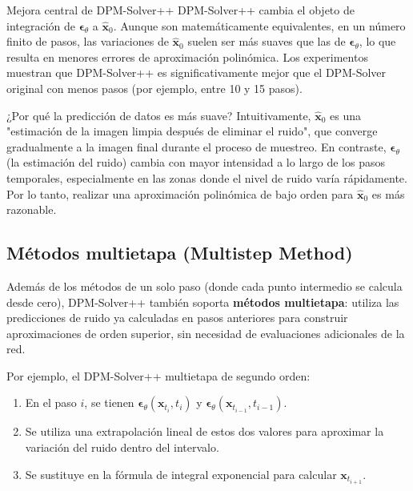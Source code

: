 \documentclass[a4paper]{article}
\begin{document}
\begin{importantbox}{Mejora central de DPM-Solver++}
DPM-Solver++ cambia el objeto de integración de $\boldsymbol{\epsilon}_\theta$ a $\hat{\mathbf{x}}_0$. Aunque son matemáticamente equivalentes, en un número finito de pasos, las variaciones de $\hat{\mathbf{x}}_0$ suelen ser más suaves que las de $\boldsymbol{\epsilon}_\theta$, lo que resulta en menores errores de aproximación polinómica. Los experimentos muestran que DPM-Solver++ es significativamente mejor que el DPM-Solver original con menos pasos (por ejemplo, entre 10 y 15 pasos).
\end{importantbox}

\begin{knowledgebox}{¿Por qué la predicción de datos es más suave?}
Intuitivamente, $\hat{\mathbf{x}}_0$ es una "estimación de la imagen limpia después de eliminar el ruido", que converge gradualmente a la imagen final durante el proceso de muestreo. En contraste, $\boldsymbol{\epsilon}_\theta$ (la estimación del ruido) cambia con mayor intensidad a lo largo de los pasos temporales, especialmente en las zonas donde el nivel de ruido varía rápidamente. Por lo tanto, realizar una aproximación polinómica de bajo orden para $\hat{\mathbf{x}}_0$ es más razonable.
\end{knowledgebox}

\subsection{Métodos multietapa (Multistep Method)}

Además de los métodos de un solo paso (donde cada punto intermedio se calcula desde cero), DPM-Solver++ también soporta \textbf{métodos multietapa}: utiliza las predicciones de ruido ya calculadas en pasos anteriores para construir aproximaciones de orden superior, sin necesidad de evaluaciones adicionales de la red.

Por ejemplo, el DPM-Solver++ multietapa de segundo orden:
\begin{enumerate}
    \item En el paso $i$, se tienen $\boldsymbol{\epsilon}_\theta(\mathbf{x}_{t_i}, t_i)$ y $\boldsymbol{\epsilon}_\theta(\mathbf{x}_{t_{i-1}}, t_{i-1})$.
    \item Se utiliza una extrapolación lineal de estos dos valores para aproximar la variación del ruido dentro del intervalo.
    \item Se sustituye en la fórmula de integral exponencial para calcular $\mathbf{x}_{t_{i+1}}$.
\end{enumerate}
\end{document}
